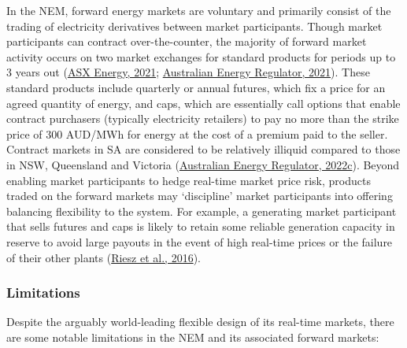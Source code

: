 \documentclass[12pt,a4paper,]{report}
\begin{document}
In the NEM, forward energy markets are voluntary and primarily consist
of the trading of electricity derivatives between market participants.
Though market participants can contract over-the-counter, the majority
of forward market activity occurs on two market exchanges for standard
products for periods up to 3 years out
(\protect\hyperlink{ref-asxenergyAustralianElectricityMarket2021}{ASX
Energy, 2021};
\protect\hyperlink{ref-australianenergyregulatorStateEnergyMarket2021}{Australian
Energy Regulator, 2021}). These standard products include quarterly or
annual futures, which fix a price for an agreed quantity of energy, and
caps, which are essentially call options that enable contract purchasers
(typically electricity retailers) to pay no more than the strike price
of 300 AUD/MWh for energy at the cost of a premium paid to the seller.
Contract markets in SA are considered to be relatively illiquid compared
to those in NSW, Queensland and Victoria
(\protect\hyperlink{ref-australianenergyregulatorStateEnergyMarket2022}{Australian
Energy Regulator, 2022c}). Beyond enabling market participants to hedge
real-time market price risk, products traded on the forward markets may
`discipline' market participants into offering balancing flexibility to
the system. For example, a generating market participant that sells
futures and caps is likely to retain some reliable generation capacity
in reserve to avoid large payouts in the event of high real-time prices
or the failure of their other plants
(\protect\hyperlink{ref-rieszAssessingViabilityEnergyonly2016}{Riesz et
al., 2016}).

\hypertarget{limitations}{%
\subsubsection{Limitations}\label{limitations}}

Despite the arguably world-leading flexible design of its real-time
markets, there are some notable limitations in the NEM and its
associated forward markets:
\end{document}
